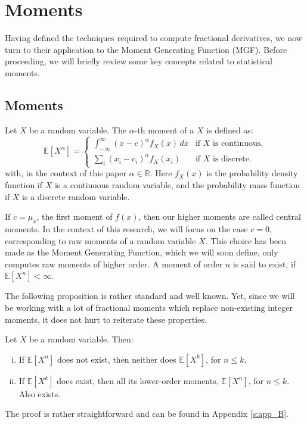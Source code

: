 \section{Moments}\label{s: moments}
Having defined the techniques required to compute fractional derivatives, we now turn to their application to the Moment Generating Function (MGF). Before proceeding, we will briefly review some key concepts related to statistical moments.
\subsection{Moments}
\begin{definition}
    Let \(X\) be a random variable.
    The \(\alpha\)-th moment of a \(X\) is defined as:
   \[
\mathbb{E}[X^\alpha] = 
\begin{cases} 
\int_{-\infty}^{\infty} (x - c)^\alpha f_X(x) \, dx & \text{if } X \text{ is continuous,} \\ 
\sum_{i} (x_i - c_ i)^\alpha f_X(x_i) & \text{if } X \text{ is discrete.} 
\end{cases}
\] with, in the context of this paper \(\alpha \in \mathbb{R}\). Here \(f_X(x)\) is the probability density function if \(X\) is a continuous random variable, and the probability mass function if \(X\) is a discrete random variable.
\end{definition}

If \(c = \mu_x\), the first moment of \(f(x)\), then our higher moments are called central moments. In the context of this research, we will focus on the case \(c = 0\), corresponding to raw moments of a random variable \(X\). This choice has been made as the Moment Generating Function, which we will soon define, only computes raw moments of higher order. A moment of order \(n\) is said to exist, if \(\mathbb{E}[X^n] < \infty\).

The following proposition is rather standard and well known. Yet, since we will be working with a lot of fractional moments which replace non-existing integer moments, it does not hurt to reiterate these properties.

\begin{proposition}\label{p: moments_1}
    Let \(X\) be a random variable. Then:
    \begin{enumerate}[(i)]
        \item If \(\mathbb{E}[X^n]\) does not exist, then neither does \(\mathbb{E}[X^k]\), for \( n \leq k\).
    
    \item If \(\mathbb{E}[X^k]\) does exist, then all its lower-order moments, \(\mathbb{E}[X^n]\), for \(n \leq k\). Also exists.
\end{enumerate}
\end{proposition}
The proof is rather straightforward and can be found in Appendix \ref{s:app_B}.


